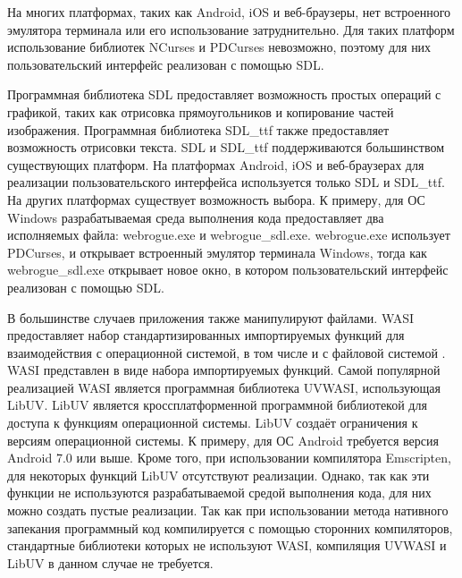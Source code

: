 На многих платформах, таких как Android, iOS и веб-браузеры, нет встроенного эмулятора терминала или его использование затруднительно.
Для таких платформ использование библиотек NCurses и PDCurses невозможно, поэтому для них пользовательский интерфейс реализован с помощью SDL.

Программная библиотека SDL предоставляет возможность простых операций с графикой, таких как отрисовка прямоугольников и копирование частей изображения.
Программная библиотека SDL\_ttf также предоставляет возможность отрисовки текста.
SDL и SDL\_ttf поддерживаются большинством существующих платформ.
На платформах Android, iOS и веб-браузерах для реализации пользовательского интерфейса используется только SDL и SDL\_ttf.
На других платформах существует возможность выбора. 
К примеру, для ОС Windows разрабатываемая среда выполнения кода предоставляет два исполняемых файла: webrogue.exe и webrogue\_sdl.exe.
webrogue.exe использует PDCurses, и открывает встроенный эмулятор терминала Windows, тогда как webrogue\_sdl.exe открывает новое окно, в котором пользовательский интерфейс реализован с помощью SDL.

В большинстве случаев приложения также манипулируют файлами.
WASI предоставляет набор стандартизированных импортируемых функций для взаимодействия с операционной системой, в том числе и с файловой системой \cite{WASI}.
WASI представлен в виде набора импортируемых функций.
Самой популярной реализацией WASI является программная библиотека UVWASI, использующая LibUV.
LibUV является кроссплатформенной программной библиотекой для доступа к функциям операционной системы.
LibUV создаёт ограничения к версиям операционной системы. 
К примеру, для ОС Android требуется версия Android 7.0 или выше.
Кроме того, при использовании компилятора Emscripten, для некоторых функций LibUV отсутствуют реализации.
Однако, так как эти функции не используются разрабатываемой средой выполнения кода, для них можно создать пустые реализации.
Так как при использовании метода нативного запекания программный код компилируется с помощью сторонних компиляторов, стандартные библиотеки которых не используют WASI, компиляция UVWASI и LibUV в данном случае не требуется.
